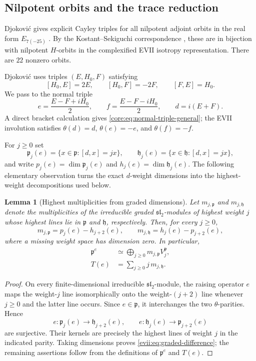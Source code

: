 \documentclass[11pt,reqno]{amsart}
\numberwithin{equation}{section}
\newtheorem{lemma}[theorem]{Lemma}
\theoremstyle{definition}
\theoremstyle{remark}
\newcommand{\fh}{\mathfrak h}
\newcommand{\fp}{\mathfrak p}
\begin{document}
\subsection{Nilpotent orbits and the trace reduction}

Djokovi\'c gives explicit Cayley triples for all nilpotent adjoint orbits in
the real form $E_{7(-25)}$ \cite[Table~6]{Djokovic}.  By the
Kostant--Sekiguchi correspondence \cite[Chapter~9]{CM}, these are in
bijection with nilpotent $H$-orbits in the complexified EVII isotropy
representation.  There are $22$ nonzero orbits.

Djokovi\'c uses triples $(E,H_0,F)$ satisfying
\[
 [H_0,E]=2E,
 \qquad
 [H_0,F]=-2F,
 \qquad
 [F,E]=H_0.
\]
We pass to the normal triple
\begin{equation}\label{evii:eq:EVII-Cayley-transform}
 e=\frac{E-F+iH_0}{2},
 \qquad
 f=\frac{E-F-iH_0}{2},
 \qquad
 d=i(E+F).
\end{equation}
A direct bracket calculation gives \eqref{core:eq:normal-triple-general}; the EVII
involution satisfies $\theta(d)=d$, $\theta(e)=-e$, and $\theta(f)=-f$.

For $j\geq0$ set
\[
 \fp_j(e)=\{x\in\fp:[d,x]=jx\},\qquad
 \fh_j(e)=\{x\in\fh:[d,x]=jx\},
\]
and write $p_j(e)=\dim\fp_j(e)$ and $h_j(e)=\dim\fh_j(e)$.
The following elementary observation turns the exact $d$-weight dimensions
into the highest-weight decompositions used below.

\begin{lemma}[Highest multiplicities from graded dimensions]
\label{evii:lem:graded-multiplicities}
Let $m_{j,\fp}$ and $m_{j,\fh}$ denote the multiplicities of the irreducible
graded $\mathfrak{sl}_2$-modules of highest weight $j$ whose highest lines lie
in $\fp$ and $\fh$, respectively.  Then, for every $j\geq0$,
\begin{equation}\label{evii:eq:graded-difference}
 m_{j,\fp}=p_j(e)-h_{j+2}(e),\qquad
 m_{j,\fh}=h_j(e)-p_{j+2}(e),
\end{equation}
where a missing weight space has dimension zero.  In particular,
\begin{align}
 \fp^e&\simeq\bigoplus_{j\geq0}m_{j,\fp}V_j^{\fp},
 \label{evii:eq:p-highest-from-weights}\\
 T(e)&=\sum_{j\geq0}j\,m_{j,\fh}.
 \label{evii:eq:T-from-weights}
\end{align}
\end{lemma}

\begin{proof}
On every finite-dimensional irreducible $\mathfrak{sl}_2$-module, the raising
operator $e$ maps the weight-$j$ line isomorphically onto the weight-$(j+2)$
line whenever $j\geq0$ and the latter line occurs.  Since $e\in\fp$, it
interchanges the two $\theta$-parities.  Hence
\[
 e:\fp_j(e)\longrightarrow\fh_{j+2}(e),\qquad
 e:\fh_j(e)\longrightarrow\fp_{j+2}(e)
\]
are surjective.  Their kernels are precisely the highest lines of weight $j$
in the indicated parity.  Taking dimensions proves
\eqref{evii:eq:graded-difference}; the remaining assertions follow from the
definitions of $\fp^e$ and $T(e)$.
\end{proof}
\end{document}
